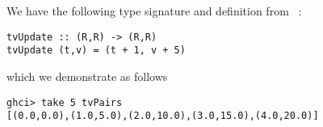 
We have the following type signature and definition from \
:
\begin{verbatim}
tvUpdate :: (R,R) -> (R,R)
tvUpdate (t,v) = (t + 1, v + 5)
\end{verbatim}
which we demonstrate as follows
\begin{verbatim}
ghci> take 5 tvPairs
[(0.0,0.0),(1.0,5.0),(2.0,10.0),(3.0,15.0),(4.0,20.0)]
\end{verbatim}
